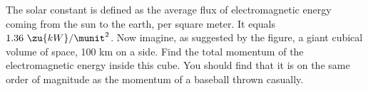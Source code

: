 The solar constant is defined as the average flux of electromagnetic energy coming from the sun
to the earth, per square meter. It equals $1.36\ \zu{kW}/\munit^2$. Now imagine, as suggested
by the figure, a giant cubical volume of space, 100 km on a side. Find the total momentum of
the electromagnetic energy inside this cube. You should find that it is on the same order
of magnitude as the momentum of a baseball thrown casually.\answercheck

